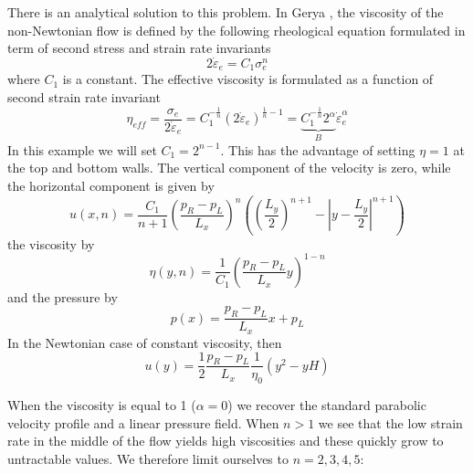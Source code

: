 There is an analytical solution to this problem. 
In Gerya \cite{gery19}, the viscosity of the non-Newtonian flow is defined by the following rheological
equation formulated in term of second stress and strain rate invariants
\[
2 \dot\varepsilon_e = C_1 \sigma_e^n
\]
where $C_1$ is a constant. The effective viscosity is formulated 
as a function of second strain rate invariant
\[
\eta_{eff} = \frac{\sigma_e}{2\dot\varepsilon_e} 
= C_1^{-\frac1n} (2 \dot\varepsilon_e)^{\frac1n-1}
= \underbrace{C_1^{-\frac1n} 2^\alpha}_{B}  \dot\varepsilon_e^{\alpha}
\]
In this example we will set $C_1=2^{n-1}$. This has the advantage of setting $\eta=1$ at 
the top and bottom walls. The vertical component 
of the velocity is zero, while the horizontal component is 
given by 
\[
u(x,n)=\frac{C_1}{n+1} \left(\frac{p_R-p_L}{L_x}\right)^n  
\left(  \left(\frac{L_y}{2}\right)^{n+1} - \left| y -\frac{L_y}{2}\right|^{n+1} \right)
\]
the viscosity by
\[
\eta(y,n)=\frac{1}{C_1} \left( \frac{p_R-p_L}{L_x} y \right)^{1-n}
\]
and the pressure by 
\[
p(x)=\frac{p_R-p_L}{L_x}x+p_L
\]
In the Newtonian case of constant viscosity, then 
\[
u(y) = \frac{1}{2} \frac{p_R-p_L}{L_x } \frac{1}{\eta_0} (y^2-yH)
\]

When the viscosity is equal to 1 ($\alpha=0$) we recover the standard parabolic 
velocity profile and a linear pressure field.
When $n>1$ we see that the low strain rate in the middle of the flow
yields high viscosities and these quickly grow to untractable values. 
We therefore limit ourselves to $n=2,3,4,5$:

